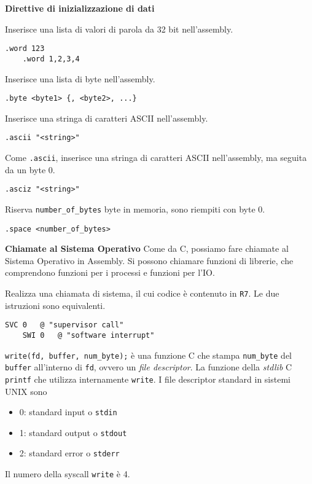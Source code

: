 \begin{defn}
	\textbf{Direttive di inizializzazione di dati}
	
	Inserisce una lista di valori di parola da 32 bit nell'assembly.
	\begin{lstlisting}[style=arm]
	.word 123
	.word 1,2,3,4
	\end{lstlisting}
	
	Inserisce una lista di byte nell'assembly.
	\begin{lstlisting}[style=arm]
	.byte <byte1> {, <byte2>, ...}
	\end{lstlisting}
	
	Inserisce una stringa di caratteri ASCII nell'assembly.
	\begin{lstlisting}[style=arm]
	.ascii "<string>"
	\end{lstlisting}
	
	Come \verb|.ascii|, inserisce una stringa di caratteri ASCII nell'assembly, ma seguita da un byte 0.
	\begin{lstlisting}[style=arm]
	.asciz "<string>"
	\end{lstlisting}
	
	Riserva \verb|number_of_bytes| byte in memoria, sono riempiti con byte 0.
	\begin{lstlisting}[style=arm]
	.space <number_of_bytes>
	\end{lstlisting}
\end{defn}

\begin{defn}
	\textbf{Chiamate al Sistema Operativo}
	Come da C, possiamo fare chiamate al Sistema Operativo in Assembly. Si possono chiamare funzioni di librerie, che comprendono funzioni per i processi e funzioni per l'IO.
	
	Realizza una chiamata di sistema, il cui codice è contenuto in \verb|R7|. Le due istruzioni sono equivalenti.
	\begin{lstlisting}[style=arm]
	SVC 0	@ "supervisor call"
	SWI 0	@ "software interrupt"
	\end{lstlisting}
\end{defn}

\begin{exmp}
	\verb|write(fd, buffer, num_byte);| è una funzione C che stampa \verb|num_byte| del \verb|buffer| all'interno di \verb|fd|, ovvero un \textit{file descriptor}. La funzione della \textit{stdlib} C \verb|printf| che utilizza internamente \verb|write|. I file descriptor standard in sistemi UNIX sono
	\begin{itemize}
		\item 0: standard input o \verb|stdin|
		\item 1: standard output o \verb|stdout|
		\item 2: standard error o \verb|stderr|
	\end{itemize}
	
	Il numero della syscall \verb|write| è 4.
\end{exmp}

